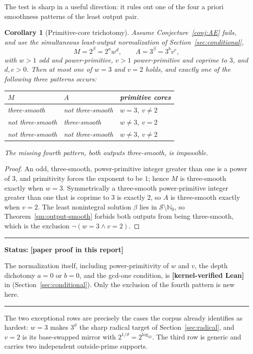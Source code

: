 \documentclass[11pt,oneside]{article}
\newtheorem{corollary}[theorem]{Corollary}
\theoremstyle{definition}
\theoremstyle{remark}
\newcommand{\Nzero}{\mathbb N_0}
\newcommand{\thetaq}{\vartheta}
\newcommand{\Sol}{\mathcal S}
\newcommand{\lean}[1]{\texttt{\detokenize{#1}}}
\newcommand{\statuslean}{\textcolor{leanblue}{\textbf{[kernel-verified Lean]}}}
\newcommand{\statusnew}{\textcolor{newgreen}{\textbf{[paper proof in this report]}}}
\newenvironment{statusbox}[1]
{\begin{center}\begin{minipage}{0.94\textwidth}\raggedright\hbadness=10000\hrule
\vspace{0.45em}\textbf{Status:} #1\par\vspace{0.35em}}
{\vspace{0.35em}\hrule\end{minipage}\end{center}}
\begin{document}
The test is sharp in a useful direction: it rules out one of the four a priori smoothness
patterns of the least output pair.

\begin{corollary}[Primitive-core trichotomy]
\label{sm:core-trichotomy}
Assume Conjecture~\ref{conj:AE} fails, and use the simultaneous least-output normalization of
Section~\ref{sec:conditional},
\[
 M=2^{\beta}=2^aw^d,\qquad A=3^{\beta}=3^bv^e,
\]
with $w>1$ odd and power-primitive, $v>1$ power-primitive and coprime to $3$, and $d,e>0$.
Then at most one of $w=3$ and $v=2$ holds, and exactly one of the following three patterns
occurs:
\begin{center}
\begin{tabular}{@{}p{}p{}p{}@{}}
\toprule
$M$ & $A$ & primitive cores\\
\midrule
three-smooth & not three-smooth & $w=3$, $v\ne2$\\
not three-smooth & three-smooth & $w\ne3$, $v=2$\\
not three-smooth & not three-smooth & $w\ne3$, $v\ne2$\\
\bottomrule
\end{tabular}
\end{center}
The missing fourth pattern, both outputs three-smooth, is impossible.
\end{corollary}

\begin{proof}
An odd, three-smooth, power-primitive integer greater than one is a power of $3$, and
primitivity forces the exponent to be $1$; hence $M$ is three-smooth exactly when $w=3$.
Symmetrically a three-smooth power-primitive integer greater than one that is coprime to $3$
is exactly $2$, so $A$ is three-smooth exactly when $v=2$.  The least nonintegral solution
$\beta$ lies in $\Sol\setminus\Nzero$, so Theorem~\ref{sm:output-smooth} forbids both
outputs from being three-smooth, which is the exclusion $\lnot(w=3\wedge v=2)$.
\end{proof}

\begin{statusbox}{\statusnew{}}
The normalization itself, including power-primitivity of $w$ and $v$, the depth dichotomy
$a=0$ or $b=0$, and the gcd-one condition, is \statuslean{} in \lean{OutputNormalization}
(Section~\ref{sec:conditional}).  Only the exclusion of the fourth pattern is new here.
\end{statusbox}

The two exceptional rows are precisely the cases the corpus already identifies as hardest:
$w=3$ makes $3^{\thetaq}$ the sharp radical target of Section~\ref{sec:radical}, and $v=2$ is
its base-swapped mirror with $2^{1/\thetaq}=2^{\log_32}$.  The third row is generic and
carries two independent outside-prime supports.
\end{document}
